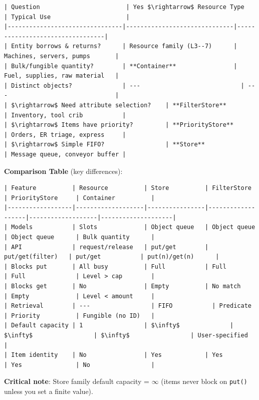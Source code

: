 \documentclass[11pt]{article}
\begin{document}
\begin{verbatim}
| Question                        | Yes $\rightarrow$ Resource Type          | Typical Use                     |
|--------------------------------|------------------------------|---------------------------------|
| Entity borrows & returns?      | Resource family (L3--7)      | Machines, servers, pumps       |
| Bulk/fungible quantity?        | **Container**                | Fuel, supplies, raw material   |
| Distinct objects?              | ---                            | ---                              |
| $\rightarrow$ Need attribute selection?    | **FilterStore**              | Inventory, tool crib           |
| $\rightarrow$ Items have priority?         | **PriorityStore**            | Orders, ER triage, express     |
| $\rightarrow$ Simple FIFO?                 | **Store**                    | Message queue, conveyor buffer |
\end{verbatim}

\textbf{Comparison Table} (key differences):

\begin{verbatim}
| Feature          | Resource          | Store          | FilterStore       | PriorityStore     | Container          |
|------------------|-------------------|----------------|-------------------|-------------------|--------------------|
| Models           | Slots             | Object queue   | Object queue      | Object queue      | Bulk quantity      |
| API              | request/release   | put/get        | put/get(filter)   | put/get           | put(n)/get(n)      |
| Blocks put       | All busy          | Full           | Full              | Full              | Level > cap        |
| Blocks get       | No                | Empty          | No match          | Empty             | Level < amount     |
| Retrieval        | ---                 | FIFO           | Predicate         | Priority          | Fungible (no ID)   |
| Default capacity | 1                 | $\infty$              | $\infty$                 | $\infty$                 | User-specified     |
| Item identity    | No                | Yes            | Yes               | Yes               | No                 |
\end{verbatim}

\textbf{Critical note}: Store family default capacity = $\infty$ (items never block on \texttt{put()} unless you set a finite value).
\end{document}
